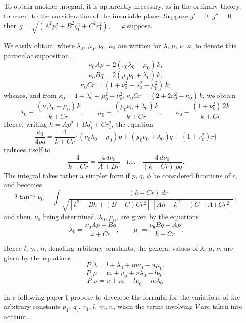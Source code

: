 \documentclass[11pt]{article}
\begin{document}
To obtain another integral, it is apparently necessary, as in the ordinary theory, to revert to the consideration of the invariable plane. Suppose $g' = 0$, $g'' = 0$, then $g = \sqrt{(A^2 p_1^2 + B^2 q_1^2 + C^2 r_1^2)}$, $= k$ suppose.

We easily obtain, where $\lambda_0$, $\mu_0$, $\nu_0$, $\kappa_0$ are written for $\lambda$, $\mu$, $\nu$, $\kappa$, to denote this particular supposition,
\[
\kappa_0 A p = 2(\nu_0\lambda_0 - \mu_0)\,k,
\]
\[
\kappa_0 B q = 2(\mu_0\nu_0 + \lambda_0)\,k,
\]
\[
\kappa_0 C r = (1 + \nu_0^2 - \lambda_0^2 - \mu_0^2)\,k;
\]
whence, and from $\kappa_0 = 1 + \lambda_0^2 + \mu_0^2 + \nu_0^2$, $\kappa_0 C r = (2 + 2\nu_0^2 - \kappa_0)\,k$, we obtain
\[
\lambda_0 = \frac{(\nu_0\lambda_0 - \mu_0)\,k}{k + C r}, \qquad \mu_0 = \frac{(\mu_0\nu_0 + \lambda_0)\,k}{k + C r}, \qquad \kappa_0 = \frac{(1 + \nu_0^2)\,2 k}{k + C r}.
\]
Hence, writing $h = A p_1^2 + B q_1^2 + C r_1^2$, the equation
\[
\frac{\kappa_0}{4 p q} = \frac{4}{k + C r}\big\{(\nu_0\lambda_0 - \mu_0) p + (\mu_0\nu_0 + \lambda_0) q + (1 + \nu_0^2) r\big\}
\]
reduces itself to
\[
\frac{4}{k + C r} = \frac{4 \, d\nu_0}{A + B r}
\quad\text{i.e.}\quad
\frac{4 \, d\nu_0}{(k + C r)\,p q}.
\]
The integral takes rather a simpler form if $p$, $q$, $\phi$ be considered functions of $r$, and becomes
\[
2 \tan^{-1}\nu_0 = \int \frac{(k + C r)\,dr}{\sqrt{[k^2 - B h + (B - C) C r^2]\,[A h - k^2 + (C - A) C r^2]}},
\]
and then, $\nu_0$ being determined, $\lambda_0$, $\mu_0$, are given by the equations
\[
\lambda_0 = \frac{\nu_0 A p + B q}{k + C r}, \qquad \mu_0 = \frac{\nu_0 B q - A p}{k + C r}.
\]

Hence $l$, $m$, $n$, denoting arbitrary constants, the general values of $\lambda$, $\mu$, $\nu$, are given by the equations
\[
P_0 \lambda = l + \lambda_0 + m\nu_0 - n\mu_0,
\]
\[
P_0 \mu    = m + \mu_0 + n\lambda_0 - l\nu_0,
\]
\[
P_0 \nu    = n + \nu_0 + l\mu_0 - m\lambda_0.
\]

In a following paper I propose to develope the formul\ae{} for the variations of the arbitrary constants $p_1$, $q_1$, $r_1$, $l$, $m$, $n$, when the terms involving $V$ are taken into account.
\end{document}
